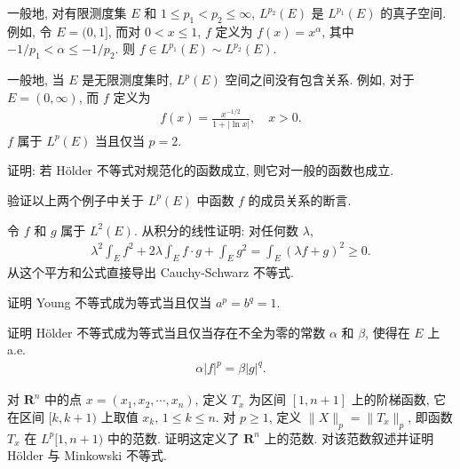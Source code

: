 \documentclass[../../main.tex]{subfiles}
\begin{document}
\begin{example}\label{example:ch07-Lp真子空间}
一般地, 对有限测度集 $E$ 和 $1\leqslant p_{1}<p_{2}\leqslant\infty$, $L^{p_{2}}(E)$ 是 $L^{p_{1}}(E)$ 的真子空间. 例如, 令 $E=(0,1]$, 而对 $0<x\leqslant 1$, $f$ 定义为 $f(x)=x^{\alpha}$, 其中 $-1/p_{1}<\alpha\leqslant-1/p_{2}$. 则 $f\in L^{p_{1}}(E)\sim L^{p_{2}}(E)$.
\end{example}

\begin{example}\label{example:ch07-Lp无包含}
一般地, 当 $E$ 是无限测度集时, $L^{p}(E)$ 空间之间没有包含关系. 例如, 对于 $E=(0,\infty)$, 而 $f$ 定义为
\begin{align*}
f(x)=\frac{x^{-1/2}}{1+|\ln x|},\quad x>0.
\end{align*}
$f$ 属于 $L^{p}(E)$ 当且仅当 $p=2$.
\end{example}

\begin{exercise}\label{exercise:ch07-06}
证明: 若 H\"older 不等式对规范化的函数成立, 则它对一般的函数也成立.
\end{exercise}

\begin{exercise}\label{exercise:ch07-07}
验证以上两个例子中关于 $L^{p}(E)$ 中函数 $f$ 的成员关系的断言.
\end{exercise}

\begin{exercise}\label{exercise:ch07-08}
令 $f$ 和 $g$ 属于 $L^{2}(E)$. 从积分的线性证明: 对任何数 $\lambda$,
\begin{align*}
\lambda^{2}\int_{E}f^{2}+2\lambda\int_{E}f\cdot g+\int_{E}g^{2}=\int_{E}(\lambda f+g)^{2}\geqslant 0.
\end{align*}
从这个平方和公式直接导出 Cauchy-Schwarz 不等式.
\end{exercise}

\begin{exercise}\label{exercise:ch07-09}
证明 Young 不等式成为等式当且仅当 $a^{p}=b^{q}=1$.
\end{exercise}

\begin{exercise}\label{exercise:ch07-10}
证明 H\"older 不等式成为等式当且仅当存在不全为零的常数 $\alpha$ 和 $\beta$, 使得在 $E$ 上 a.e.
\begin{align*}
\alpha|f|^{p}=\beta|g|^{q}.
\end{align*}
\end{exercise}

\begin{exercise}\label{exercise:ch07-11}
对 $\mathbf{R}^{n}$ 中的点 $x=(x_{1},x_{2},\cdots,x_{n})$, 定义 $T_{x}$ 为区间 $[1,n+1]$ 上的阶梯函数, 它在区间 $[k,k+1)$ 上取值 $x_{k}$, $1\leqslant k\leqslant n$. 对 $p\geqslant 1$, 定义 $\|X\|_{p}=\|T_{x}\|_{p}$, 即函数 $T_{x}$ 在 $L^{p}[1,n+1)$ 中的范数. 证明这定义了 $\mathbf{R}^{n}$ 上的范数. 对该范数叙述并证明 H\"older 与 Minkowski 不等式.
\end{exercise}
\end{document}
